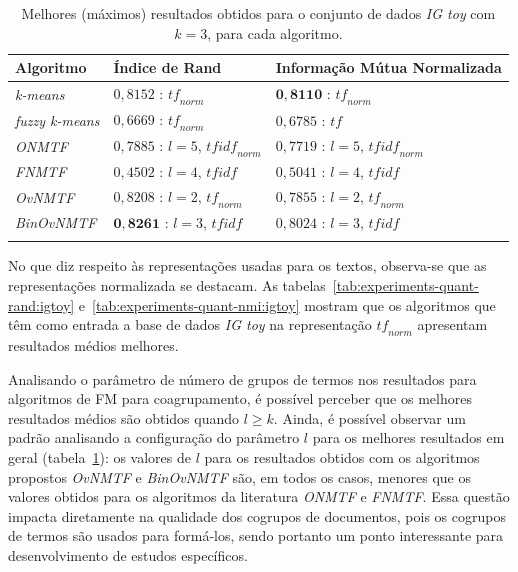 \documentclass[
    12pt,                %
    oneside,            %
    a4paper,            %
    english,            %
    brazil                %
    ]{abntex2ppgsi}
\begin{document}
\begin{table}[H]
\centering
    \caption{Melhores (máximos) resultados obtidos para o conjunto de dados \textit{IG toy} com $k = 3$, para cada algoritmo.}
    \begin{tabular}{lll}
        \hline
        \textbf{Algoritmo}              & \textbf{Índice de Rand} & \textbf{Informação Mútua Normalizada} \\
        \hline
        \textit{k-means}       & $0,8152$ : $\textit{tf}_{norm}$             & $\mathbf{0,8110}$ : $\textit{tf}_{norm}$ \\
        \textit{fuzzy k-means} & $0,6669$ : $\textit{tf}_{norm}$              & $0,6785$ : $\textit{tf}$ \\
        \textit{ONMTF}         & $0,7885$ : $l=5$, $\textit{tfidf}_{norm}$    & $0,7719$ :  $l=5$, $\textit{tfidf}_{norm}$ \\
        \textit{FNMTF}         & $0,4502$ : $l=4$, $\textit{tfidf}$           & $0,5041$ :  $l=4$, $\textit{tfidf}$ \\
        \textit{OvNMTF}        & $0,8208$ : $l=2$, $\textit{tf}_{norm}$      & $0,7855$ :  $l=2$, $\textit{tf}_{norm}$ \\
        \textit{BinOvNMTF}     & $\mathbf{0,8261}$ : $l=3$, $\textit{tfidf}$  & $0,8024$ : $l=3$, $\textit{tfidf}$  \\
        \hline \\
    \end{tabular}
    \label{tab:experiments-quant-best:igtoy}
\end{table}

No que diz respeito às representações usadas para os textos, observa-se que as representações normalizada se destacam. As tabelas~\ref{tab:experiments-quant-rand:igtoy} e~\ref{tab:experiments-quant-nmi:igtoy} mostram que os algoritmos que têm como entrada a base de dados \textit{IG toy} na representação $\textit{tf}_{norm}$ apresentam resultados médios melhores.

Analisando o parâmetro de número de grupos de termos nos resultados para algoritmos de FM para coagrupamento, é possível perceber que os melhores resultados médios são obtidos quando $l \geq k$. Ainda, é possível observar um padrão analisando a configuração do parâmetro $l$ para os melhores resultados em geral (tabela~\ref{tab:experiments-quant-best:igtoy}): os valores de $l$ para os resultados obtidos com os algoritmos propostos \textit{OvNMTF} e \textit{BinOvNMTF} são, em todos os casos, menores que os valores obtidos para os algoritmos da literatura \textit{ONMTF} e \textit{FNMTF}. Essa questão impacta diretamente na qualidade dos cogrupos de documentos, pois os cogrupos de termos são usados para formá-los, sendo portanto um ponto interessante para desenvolvimento de estudos específicos.
\end{document}
